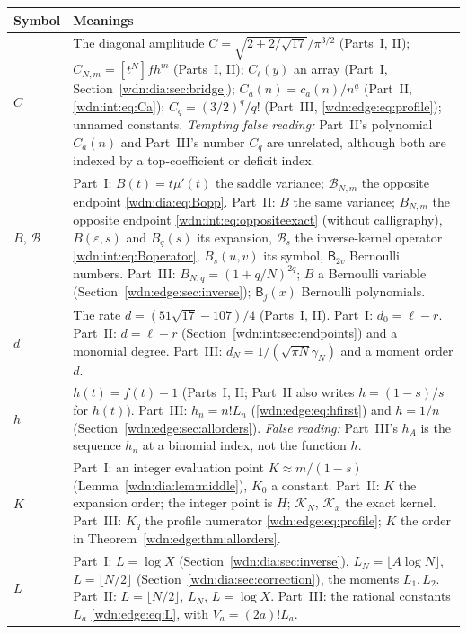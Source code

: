 \documentclass[11pt,letterpaper]{article}
\theoremstyle{remark}\newtheorem{remark}[theorem]{Remark}
\newcommand{\fall}[2]{#1^{\underline{#2}}}
\newcommand{\eps}{\varepsilon}
\begin{document}
\begin{longtable}{@{}>{\raggedright\arraybackslash}p{} >{\raggedright\arraybackslash}p{}@{}}
\toprule
Symbol & Meanings\\
\midrule
\endhead
$C$ & The diagonal amplitude $C=\sqrt{2+2/\sqrt{17}}/\pi^{3/2}$ (Parts~I, II); $C_{N,m}=[t^N]fh^m$ (Parts~I, II); $C_\ell(y)$ an array (Part~I, Section~\ref{wdn:dia:sec:bridge}); $C_a(n)=c_a(n)/\fall na$ (Part~II, \eqref{wdn:int:eq:Ca}); $C_q=(3/2)^q/q!$ (Part~III, \eqref{wdn:edge:eq:profile}); unnamed constants. \emph{Tempting false reading:} Part~II's polynomial $C_a(n)$ and Part~III's number $C_q$ are unrelated, although both are indexed by a top-coefficient or deficit index.\\
$B$, $\mathcal B$ & Part~I: $B(t)=t\mu'(t)$ the saddle variance; $\mathcal B_{N,m}$ the opposite endpoint \eqref{wdn:dia:eq:Bopp}. Part~II: $B$ the same variance; $B_{N,m}$ the opposite endpoint \eqref{wdn:int:eq:oppositeexact} (without calligraphy), $B(\eps,s)$ and $B_q(s)$ its expansion, $\mathcal B_s$ the inverse-kernel operator \eqref{wdn:int:eq:Boperator}, $B_s(u,v)$ its symbol, $\mathsf B_{2v}$ Bernoulli numbers. Part~III: $B_{N,q}=(1+q/N)^{2q}$; $B$ a Bernoulli variable (Section~\ref{wdn:edge:sec:inverse}); $\mathsf B_j(x)$ Bernoulli polynomials.\\
$d$ & The rate $d=(51\sqrt{17}-107)/4$ (Parts~I, II). Part~I: $d_0=\ell-r$. Part~II: $d=\ell-r$ (Section~\ref{wdn:int:sec:endpoints}) and a monomial degree. Part~III: $d_N=1/(\sqrt{\pi N}\gamma_N)$ and a moment order $d$.\\
$h$ & $h(t)=f(t)-1$ (Parts~I, II; Part~II also writes $h=(1-s)/s$ for $h(t)$). Part~III: $h_n=n!L_n$ (\eqref{wdn:edge:eq:hfirst}) and $h=1/n$ (Section~\ref{wdn:edge:sec:allorders}). \emph{False reading:} Part~III's $h_A$ is the sequence $h_n$ at a binomial index, not the function $h$.\\
$K$ & Part~I: an integer evaluation point $K\approx m/(1-s)$ (Lemma~\ref{wdn:dia:lem:middle}), $K_0$ a constant. Part~II: $K$ the expansion order; the integer point is $H$; $\mathcal K_N$, $\mathcal K_x$ the exact kernel. Part~III: $K_q$ the profile numerator \eqref{wdn:edge:eq:profile}; $K$ the order in Theorem~\ref{wdn:edge:thm:allorders}.\\
$L$ & Part~I: $L=\log X$ (Section~\ref{wdn:dia:sec:inverse}), $L_N=\lfloor A\log N\rfloor$, $L=\lfloor N/2\rfloor$ (Section~\ref{wdn:dia:sec:correction}), the moments $L_1,L_2$. Part~II: $L=\lfloor N/2\rfloor$, $L_N$, $L=\log X$. Part~III: the rational constants $L_a$ \eqref{wdn:edge:eq:L}, with $V_a=(2a)!L_a$.\\

\end{longtable}
\end{document}
